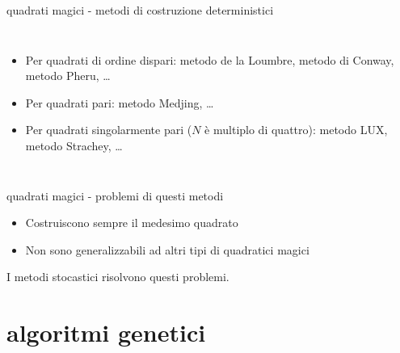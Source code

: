 \documentclass[10pt]{beamer}
\begin{document}
\begin{frame}{quadrati magici - metodi di costruzione deterministici}

	\begin{columns}[T,onlytextwidth]


	\begin{itemize}
		\item Per quadrati di ordine dispari: metodo de la Loumbre, metodo di Conway, metodo Pheru, \dots
		\item Per quadrati pari: metodo Medjing, \dots
		\item Per quadrati singolarmente pari ($ N $ è multiplo di quattro): metodo LUX, metodo Strachey, \dots
	\end{itemize}




	\end{columns}

\end{frame}

\begin{frame}{quadrati magici - problemi di questi metodi}
  \begin{itemize}
  	\item Costruiscono sempre il medesimo quadrato
  	\item Non sono generalizzabili ad altri tipi di quadratici magici
  \end{itemize}
  \centering
  I metodi stocastici risolvono questi problemi.
\end{frame}

\section{algoritmi genetici}
\end{document}

